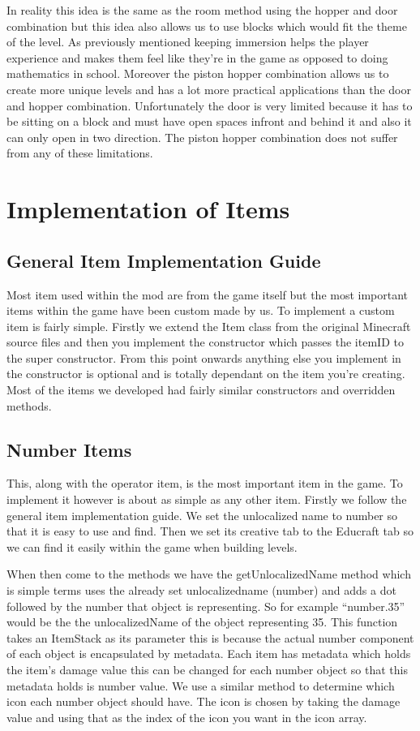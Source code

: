 In reality this idea is the same as the room method using the hopper and door combination but this idea also allows us to use blocks which would fit the theme of the level. As previously mentioned keeping immersion helps the player experience and makes them feel like they’re in the game as opposed to doing mathematics in school. Moreover the piston hopper combination allows us to create more unique levels and has a lot more practical applications than the door and hopper combination. Unfortunately the door is very limited because it has to be sitting on a block and must have open spaces infront and behind it and also it can only open in two direction. The piston hopper combination does not suffer from any of these limitations.

\section{Implementation of Items}
\subsection{General Item Implementation Guide}
Most item used within the mod are from the game itself but the most important items within the game have been custom made by us. To implement a custom item is fairly simple. Firstly we extend the Item class from the original Minecraft source files and then you implement the constructor which passes the itemID to the super constructor. From this point onwards anything else you implement in the constructor is optional and is totally dependant on the item you're creating. Most of the items we developed had fairly similar constructors and overridden methods.

\subsection{Number Items}
This, along with the operator item, is the most important item in the game. To implement it however is about as simple as any other item. Firstly we follow the general item implementation guide. We set the unlocalized name to number so that it is easy to use and find. Then we set its creative tab to the Educraft tab so we can find it easily within the game when building levels.

When then come to the methods we have the getUnlocalizedName method which is simple terms uses the already set unlocalizedname (number) and adds a dot followed by the number that object is representing. So for example “number.35” would be the the unlocalizedName of the object representing 35. This function takes an ItemStack as its parameter this is because the actual number component of each object is encapsulated by metadata. Each item has metadata which holds the item’s damage value this can be changed for each number object so that this metadata holds is number value. We use a similar method to determine which icon each number object should have. The icon is chosen by taking the damage value and using that as the index of the icon you want in the icon array.

